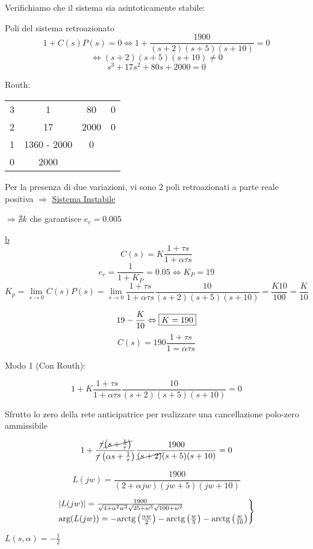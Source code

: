 \documentclass{article}
\begin{document}
Verifichiamo che il sistema sia asintoticamente stabile:

Poli del sistema retroazionato
\[ 1 + C(s)P(s) = 0 \Leftrightarrow 1 + \frac{1900}{(s+2)(s+5)(s+10)} = 0\]
\[ \Leftrightarrow (s+2)(s+5)(s+10) \neq 0\]
\[ s^3 + 17s^2 + 80 s + 2000 = 0\]

Routh:

\begin{tabular}{c|c c c}
        3 & 1 & 80 & 0\\
        2 & 17 & 2000 & 0\\
        1 & 1360 - 2000 & 0\\
        0 & 2000
\end{tabular}

Per la presenza di due variazioni, vi sono 2 poli retroazionati a parte reale positiva $\Rightarrow$ \underline{Sistema Instabile}

$\Rightarrow \nexists k$  che garantisce $e_r = 0.005$


\underline{b}
\[ C(s) = K\frac{1 + \tau s}{1 + \alpha \tau s} \]
\[ e_r = \frac{1}{1 + K_P} = 0.05 \Leftrightarrow K_P = 19\]
\[ K_p = \lim_{s \to 0} C(s)P(s) = \lim_{s \to 0} \frac{1 + \tau s}{1 + \alpha \tau s} \frac{10}{(s+2)(s+5)(s+10)} = \frac{K 10}{100} = \frac{K}{10} \]

\[ 19 - \frac{K}{10} \Leftrightarrow \framebox{$ K = 190 $} \]
\[ C(s) = 190 \frac{1 + \tau s}{1 = \alpha \tau s} \]

Modo 1 (Con Routh):


\[ 1 + K \frac{1 + \tau s }{1 + \alpha \tau s }\frac {10}{(s+2)(s+5) (s+10)} =  0\]

Sfrutto lo zero della rete anticipatrice per realizzare una cancellazione polo-zero ammissibile

\[ 1+ \frac{\cancel{\tau}\cancel{\left( s + \frac{1}{\tau}\right)}}{\cancel{\tau} \left( \alpha s + \frac{1}{\tau}\right)}\frac{1900}{\cancel{(s+2)}(s+5)(s+10)} = 0 \]

\[ L(jw) = \frac{1900}{(2 + \alpha jw) (jw + 5)(jw + 10)} \]

\[
    \begin{rcases}
     |L(jw)| = \frac{1900}{\sqrt{4 + \alpha^2 w^2} \sqrt{25 + w^5} \sqrt{100 + w^2}}\\
     \text{arg}(L(jw)) = -\text{arctg}\left(\frac{\alpha w}{2}\right) - \text{arctg}\left( \frac{w}{5} \right) - \text{arctg}\left(\frac{w}{10}\right)
    \end{rcases}
\]

$L(s, \alpha) = -\frac{1}{2}$ 
\end{document}
